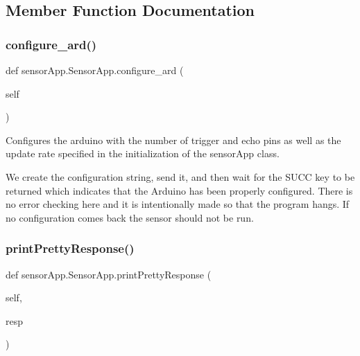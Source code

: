 \subsection{Member Function Documentation}
\mbox{\label{classsensor_app_1_1_sensor_app_a26bc47736a7df7fb5c0b946be1963c47}} 
\subsubsection{\texorpdfstring{configure\+\_\+ard()}{configure\_ard()}}
{\footnotesize\ttfamily def sensor\+App.\+Sensor\+App.\+configure\+\_\+ard (\begin{DoxyParamCaption}\item[{}]{self }\end{DoxyParamCaption})}



Configures the arduino with the number of trigger and echo pins as well as the update rate specified in the initialization of the sensor\+App class. 

We create the configuration string, send it, and then wait for the S\+U\+CC key to be returned which indicates that the Arduino has been properly configured. There is no error checking here and it is intentionally made so that the program hangs. If no configuration comes back the sensor should not be run. \mbox{\label{classsensor_app_1_1_sensor_app_ac51bf775c9b2e7e176a3535127036e69}} 
\subsubsection{\texorpdfstring{print\+Pretty\+Response()}{printPrettyResponse()}}
{\footnotesize\ttfamily def sensor\+App.\+Sensor\+App.\+print\+Pretty\+Response (\begin{DoxyParamCaption}\item[{}]{self,  }\item[{}]{resp }\end{DoxyParamCaption})}



